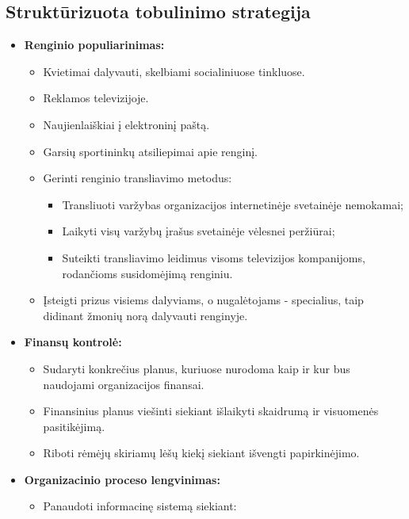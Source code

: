 \documentclass{VUMIFPSkursinis}
\begin{document}
	\subsection{Struktūrizuota tobulinimo strategija} \label{versloProcesoTobulinimoStrategija_strukturizuota}
			\begin{itemize}
				\item \textbf{Renginio populiarinimas:}
          \begin{itemize}
            \item Kvietimai dalyvauti, skelbiami socialiniuose tinkluose.
            \item Reklamos televizijoje.
            \item Naujienlaiškiai į elektroninį paštą.
            \item Garsių sportininkų atsiliepimai apie renginį.
            \item Gerinti renginio transliavimo metodus:
              \begin{itemize}
                \item Transliuoti varžybas organizacijos internetinėje svetainėje nemokamai;
                \item Laikyti visų varžybų įrašus svetainėje vėlesnei peržiūrai;
                \item Suteikti transliavimo leidimus visoms televizijos kompanijoms, rodančioms susidomėjimą renginiu.
              \end{itemize}
            \item Įsteigti prizus visiems dalyviams, o nugalėtojams - specialius, taip didinant žmonių norą dalyvauti renginyje.
          \end{itemize}
        \item \textbf{Finansų kontrolė:}
          \begin{itemize}
            \item Sudaryti konkrečius planus, kuriuose nurodoma kaip ir kur bus naudojami organizacijos finansai.
            \item Finansinius planus viešinti siekiant išlaikyti skaidrumą ir visuomenės pasitikėjimą.
            \item Riboti rėmėjų skiriamų lėšų kiekį siekiant išvengti papirkinėjimo.
          \end{itemize}
        \item \textbf{Organizacinio proceso lengvinimas:}
          \begin{itemize}
            \item Panaudoti informacinę sistemą siekiant:

\end{itemize}
\end{itemize}
\end{document}
